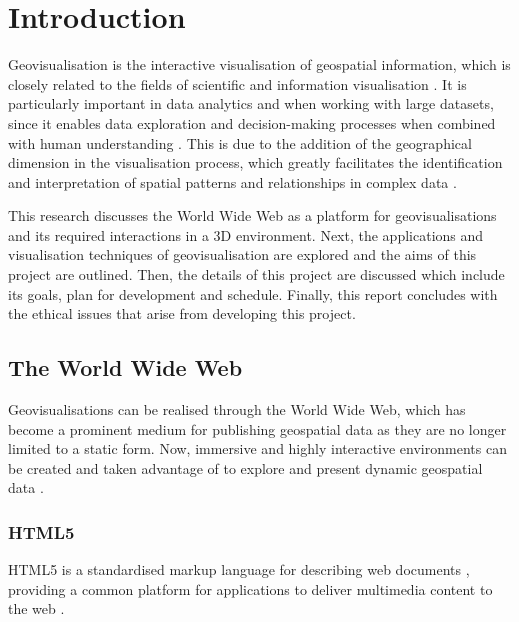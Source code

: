 \documentclass[
	fontsize=11pt
	headlines=2,
	footlines=2,
	parskip=half
]{scrartcl}
\begin{document}
	\section{Introduction} {
	\label{sec:introduction}

		Geovisualisation is the interactive visualisation of geospatial information, which is closely related to the fields of scientific and information visualisation \parencite{jiang2005geovisualization}. It is particularly important in data analytics and when working with large datasets, since it enables data exploration and decision-making processes when combined with human understanding \parencite{grinstein2002introduction, hendley1995case}. This is due to the addition of the geographical dimension in the visualisation process, which greatly facilitates the identification and interpretation of spatial patterns and relationships in complex data \parencite{kwan2004geovisualization}.
		
		This research discusses the World Wide Web as a platform for geovisualisations and its required interactions in a 3D environment. Next, the applications and visualisation techniques of geovisualisation are explored and the aims of this project are outlined. Then, the details of this project are discussed which include its goals, plan for development and schedule. Finally, this report concludes with the ethical issues that arise from developing this project.

		\subsection{The World Wide Web} {

			Geovisualisations can be realised through the World Wide Web, which has become a prominent medium for publishing geospatial data as they are no longer limited to a static form. Now, immersive and highly interactive environments can be created and taken advantage of to explore and present dynamic geospatial data \parencite{maceachren2001research}.

			\subsubsection{HTML5} {

				HTML5 is a standardised markup language for describing web documents \parencite{w3c2014html5}, providing a common platform for applications to deliver multimedia content to the web \parencite{lawson2011introducing, chaturvedi2015web}.

}}}
\end{document}

